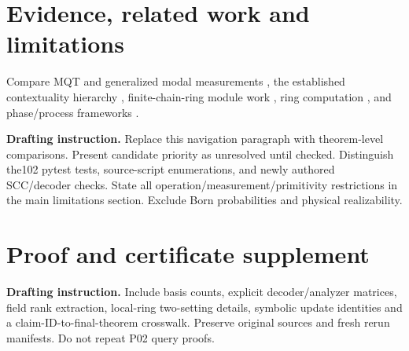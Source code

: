 \documentclass[11pt]{article}
\newcommand{\buildnote}[1]{\par\smallskip\noindent\textbf{Drafting instruction.} #1\par\smallskip}
\begin{document}
\section{Evidence, related work and limitations}
Compare MQT and generalized modal measurements \cite{Schumacher2010,Schumacher2012},
the established contextuality hierarchy \cite{AbramskyBrandenburger2011},
finite-chain-ring module work \cite{Byrne2021}, ring computation
\cite{deBeaudrap2014}, and phase/process frameworks
\cite{Coecke2010,Gogioso2017,Cho2015,CockettLack2002}.
\buildnote{Replace this navigation paragraph with theorem-level comparisons.
Present candidate priority as unresolved until checked. Distinguish the102
pytest tests, source-script enumerations, and newly authored SCC/decoder
checks. State all operation/measurement/primitivity restrictions in the main
limitations section. Exclude Born probabilities and physical realizability.}

\appendix
\section{Proof and certificate supplement}
\buildnote{Include basis counts, explicit decoder/analyzer matrices, field rank
extraction, local-ring two-setting details, symbolic update identities and a
claim-ID-to-final-theorem crosswalk. Preserve original sources and fresh rerun
manifests. Do not repeat P02 query proofs.}

\end{document}
